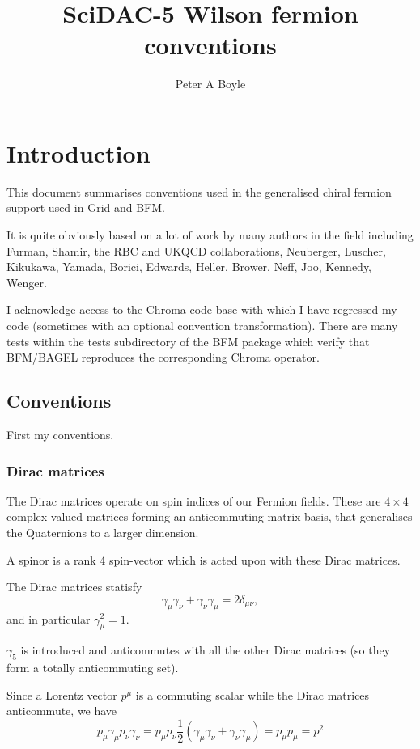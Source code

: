 \documentclass[letter,10pt]{report}
\title{SciDAC-5 Wilson fermion conventions}
\author{Peter A Boyle}
\begin{document}
\maketitle

\tableofcontents

\chapter{Introduction}

This document summarises conventions used in the 
generalised chiral fermion support used in Grid and BFM.

It is quite obviously based on a lot of work by many authors in
the field including Furman, Shamir, the RBC and UKQCD collaborations,
Neuberger, Luscher, Kikukawa, Yamada, 
Borici, Edwards, Heller, Brower, Neff, Joo, Kennedy, Wenger.

I acknowledge access to the Chroma code base with which I have
regressed my code (sometimes with an optional convention transformation).
There are many tests within the tests subdirectory of the BFM 
package which verify that BFM/BAGEL reproduces the corresponding Chroma operator.

\section{Conventions}
First my conventions.

\subsection{Dirac matrices}

The Dirac matrices operate on spin indices of our Fermion fields.
These are $4\times 4$ complex valued matrices forming an anticommuting matrix basis,
that generalises the Quaternions to a larger dimension.

A spinor is a rank 4 spin-vector which is acted upon with these Dirac matrices.

The Dirac matrices statisfy
$$
\gamma_\mu \gamma_\nu + 
\gamma_\nu \gamma_\mu = 2 \delta_{\mu\nu},
$$
and in particular $\gamma_\mu^2 = 1$.

$\gamma_5$ is introduced and anticommutes with all the other Dirac matrices (so they form a totally anticommuting set).

Since a Lorentz vector $p^\mu$ is a commuting scalar while the Dirac matrices anticommute, we have
$$
p_\mu \gamma_\mu 
p_\nu \gamma_\nu  = p_\mu p_\nu \frac{1}{2}\left( \gamma_\mu \gamma_\nu+ \gamma_\nu \gamma_\mu \right) = p_\mu p_\mu = p^2
$$
\end{document}
